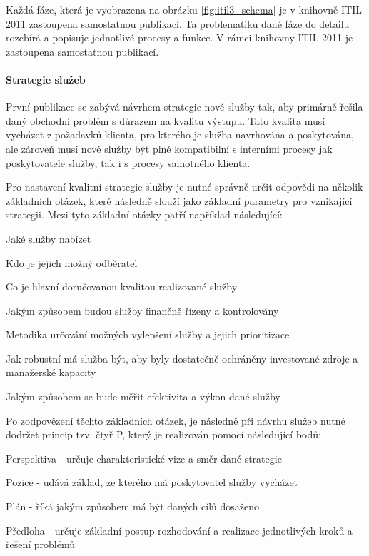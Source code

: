 \documentclass[
  digital,     %
  twoside,     %
  lof,         %
  lot,         %
]{fithesis4}
\begin{document}
Každá fáze, která je vyobrazena na obrázku \ref{fig:itil3_schema} je v knihovně ITIL 2011 zastoupena samostatnou publikací. Ta problematiku dané fáze do detailu rozebírá a popisuje jednotlivé procesy a funkce. V rámci knihovny ITIL 2011 je zastoupena samostatnou publikací. 
\paragraph{Strategie služeb}
První publikace se zabývá návrhem strategie nové služby tak, aby primárně řešila daný obchodní problém s důrazem na kvalitu výstupu. Tato kvalita musí vycházet z požadavků klienta, pro kterého je služba navrhována a poskytována, ale zároveň musí nové služby být plně kompatibilní s interními procesy jak poskytovatele služby, tak i s procesy samotného klienta.\parencite[s.~12-13]{Carlidge2007}

Pro nastavení kvalitní strategie služby je nutné správně určit odpovědi na několik základních otázek, které následně slouží jako základní parametry pro vznikající strategii.\parencite[s.~32]{Matula2017} Mezi tyto základní otázky patří například následující:

\begin{compactitem}
  \item Jaké služby nabízet
  \item Kdo je jejich možný odběratel
  \item Co je hlavní doručovanou kvalitou realizované služby
  \item Jakým způsobem budou služby finančně řízeny a kontrolovány
  \item Metodika určování možných vylepšení služby a jejich prioritizace
  \item Jak robustní má služba být, aby byly dostatečně ochráněny investované zdroje a manažerské kapacity
  \item Jakým způsobem se bude měřit efektivita a výkon dané služby
\end{compactitem}

Po zodpovězení těchto základních otázek, je následně při návrhu služeb nutné dodržet princip tzv. čtyř P, který je realizován pomocí následující bodů:\parencite[s.~13]{Carlidge2007}
\begin{compactitem}
    \item Perspektiva - určuje charakteristické vize a směr dané strategie
    \item Pozice - udává základ, ze kterého má poskytovatel služby vycházet
    \item Plán - říká jakým způsobem má být daných cílů dosaženo
    \item Předloha - určuje základní postup rozhodování a realizace jednotlivých kroků a řešení problémů
\end{compactitem}
\end{document}
